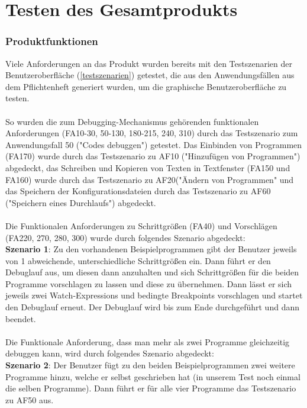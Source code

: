 \documentclass[parskip=full]{scrartcl}
\begin{document}
\newpage
\section{Testen des Gesamtprodukts}\label{gesamthwsw}

\subsubsection{Produktfunktionen}
Viele Anforderungen an das Produkt wurden bereits mit den Testszenarien der Benutzeroberfläche (\ref{testszenarien}) getestet, die aus den Anwendungsfällen aus dem Pflichtenheft generiert wurden, um die graphische Benutzeroberfläche zu testen.
\\
 \\
So wurden die zum Debugging-Mechanismus gehörenden funktionalen Anforderungen (FA10-30, 50-130, 180-215, 240, 310) durch das Testszenario zum Anwendungsfall 50 ("Codes debuggen") getestet.
Das Einbinden von Programmen (FA170) wurde durch das Testszenario zu AF10 ("Hinzufügen von Programmen") abgedeckt, das Schreiben und Kopieren von Texten in Textfenster (FA150 und FA160) wurde durch das Testszenario zu AF20("Ändern von Programmen" und das Speichern der Konfigurationsdateien durch das Testszenario zu AF60 ("Speichern eines Durchlaufs") abgedeckt.
\\
 \\
Die Funktionalen Anforderungen zu Schrittgrößen (FA40) und Vorschlägen (FA220, 270, 280, 300) wurde durch folgendes Szenario abgedeckt: \\
\textbf{Szenario 1}: Zu den vorhandenen Beispielprogrammen gibt der Benutzer jeweils von 1 abweichende, unterschiedliche Schrittgrößen ein. Dann führt er den Debuglauf aus, um diesen dann anzuhalten und sich Schrittgrößen für die beiden Programme vorschlagen zu lassen und diese zu übernehmen. Dann lässt er sich jeweils zwei Watch-Expressions und bedingte Breakpoints vorschlagen und startet den Debuglauf erneut. Der Debuglauf wird bis zum Ende durchgeführt und dann beendet.
\\
 \\
Die Funktionale Anforderung, dass man mehr als zwei Programme gleichzeitig debuggen kann, wird durch folgendes Szenario abgedeckt: 
\\
\textbf{Szenario 2}: Der Benutzer fügt zu den beiden Beispielprogrammen zwei weitere Programme hinzu, welche er selbst geschrieben hat (in unserem Test noch einmal die selben Programme). Dann führt er für alle vier Programme das Testszenario zu AF50 aus.
\end{document}
